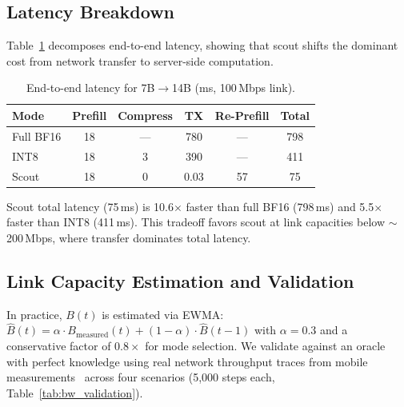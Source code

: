 \documentclass{article}
\begin{document}
\subsection{Latency Breakdown}

Table~\ref{tab:scout_latency} decomposes end-to-end latency, showing that scout shifts the dominant cost from network transfer to server-side computation.

\begin{table}[t]
\centering
\caption{End-to-end latency for 7B$\to$14B (ms, 100\,Mbps link).}
\label{tab:scout_latency}
\small
\begin{tabular}{@{}lccccc@{}}
\toprule
\textbf{Mode} & \textbf{Prefill} & \textbf{Compress} & \textbf{TX} & \textbf{Re-Prefill} & \textbf{Total} \\
\midrule
Full BF16 & 18 & --- & 780 & --- & 798 \\
INT8      & 18 & 3   & 390 & --- & 411 \\
Scout     & 18 & 0   & 0.03 & 57 & 75 \\
\bottomrule
\end{tabular}
\end{table}

Scout total latency (75\,ms) is 10.6$\times$ faster than full BF16 (798\,ms) and 5.5$\times$ faster than INT8 (411\,ms).
This tradeoff favors scout at link capacities below $\sim$200\,Mbps, where transfer dominates total latency.

\subsection{Link Capacity Estimation and Validation}

In practice, $B(t)$ is estimated via EWMA:
$\hat{B}(t) = \alpha \cdot B_{\text{measured}}(t) + (1 - \alpha) \cdot \hat{B}(t-1)$
with $\alpha = 0.3$ and a conservative factor of $0.8\times$ for mode selection.
We validate against an oracle with perfect knowledge using real network throughput traces from mobile measurements~\citep{lumos5g} across four scenarios (5{,}000 steps each, Table~\ref{tab:bw_validation}).
\end{document}
